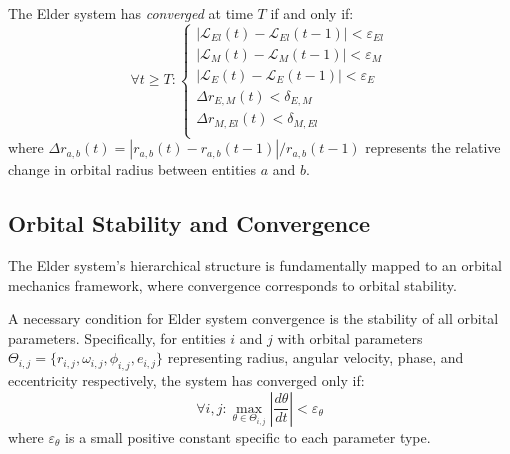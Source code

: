 \begin{definition}
The Elder system has \emph{converged} at time $T$ if and only if:
\begin{equation}
\forall t \geq T: \left\{
\begin{array}{l}
|\mathcal{L}_{El}(t) - \mathcal{L}_{El}(t-1)| < \varepsilon_{El} \\
|\mathcal{L}_{M}(t) - \mathcal{L}_{M}(t-1)| < \varepsilon_{M} \\
|\mathcal{L}_{E}(t) - \mathcal{L}_{E}(t-1)| < \varepsilon_{E} \\
\Delta r_{E,M}(t) < \delta_{E,M} \\
\Delta r_{M,El}(t) < \delta_{M,El} \\
\end{array}
\right.
\end{equation}
where $\Delta r_{a,b}(t) = |r_{a,b}(t) - r_{a,b}(t-1)|/r_{a,b}(t-1)$ represents the relative change in orbital radius between entities $a$ and $b$.
\end{definition}

\subsection{Orbital Stability and Convergence}

The Elder system's hierarchical structure is fundamentally mapped to an orbital mechanics framework, where convergence corresponds to orbital stability.

\begin{theorem}
A necessary condition for Elder system convergence is the stability of all orbital parameters. Specifically, for entities $i$ and $j$ with orbital parameters $\Theta_{i,j} = \{r_{i,j}, \omega_{i,j}, \phi_{i,j}, e_{i,j}\}$ representing radius, angular velocity, phase, and eccentricity respectively, the system has converged only if:
\begin{equation}
\forall i,j: \max_{\theta \in \Theta_{i,j}} \left| \frac{d\theta}{dt} \right| < \varepsilon_{\theta}
\end{equation}
where $\varepsilon_{\theta}$ is a small positive constant specific to each parameter type.
\end{theorem}

